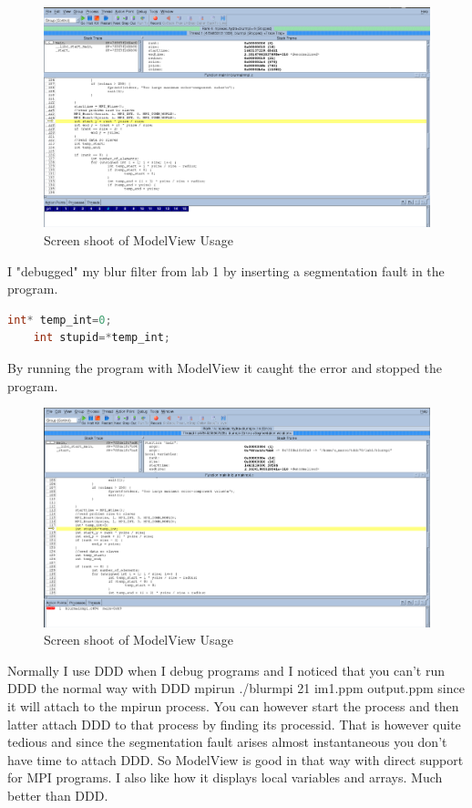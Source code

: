 \documentclass[10pt,twocolumn]{article}
\begin{document}
\begin{figure}[H]
	\begin{center}
		\includegraphics[scale=0.124]{figurer/screen.png}
	\end{center}
	\caption{Screen shoot of ModelView Usage}
\end{figure}
I "debugged" my blur filter from lab 1 by inserting a segmentation fault in the program.
\begin{lstlisting}[language=c]
	int* temp_int=0;
	int stupid=*temp_int;
\end{lstlisting}
By running the program with ModelView it caught the error and stopped the program. 
\begin{figure}[H]
	\begin{center}
		\includegraphics[scale=0.124]{figurer/screen1.png}
	\end{center}
	\caption{Screen shoot of ModelView Usage}
\end{figure}

Normally I use DDD when I debug programs and I noticed that you can't run DDD the normal way with DDD mpirun ./blurmpi 21 im1.ppm output.ppm since it will attach to the mpirun process. You can however start the process and then latter attach DDD to that process by finding its processid. That is however quite tedious and since the segmentation fault arises almost instantaneous you don't have time to attach DDD. So ModelView is good in that way with direct support for MPI programs. I also like how it displays local variables and arrays. Much better than DDD.
\end{document}
